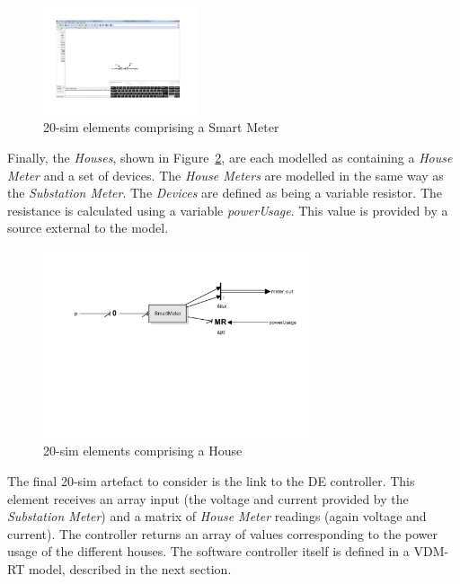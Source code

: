 \begin{description}
\begin{figure}[htb]
\begin{center}
\includegraphics[width=0.4\textwidth]{smartgrid/20-sim-meter.pdf}
\caption{20-sim elements comprising a Smart Meter}
\label{fig:20sim-meter}
\end{center}
\end{figure}

Finally, the \textit{Houses}, shown in Figure~\ref{fig:20sim-house}, are each modelled as containing a \textit{House Meter} and a set of devices. The \textit{House Meters} are modelled in the same way as the \textit{Substation Meter}. The \textit{Devices} are defined as being a variable resistor. The resistance is calculated using a variable \emph{powerUsage}. This value is provided by a source external to the model.

\begin{figure}[htb]
\begin{center}
\includegraphics[width=0.7\textwidth]{smartgrid/20-sim-house.pdf}
\caption{20-sim elements comprising a House}
\label{fig:20sim-house}
\end{center}
\end{figure}

The final 20-sim artefact to consider is the link to the DE controller. This element receives an array input (the voltage and current provided by the \textit{Substation Meter}) and a matrix of \textit{House Meter} readings (again voltage and current). The controller returns an array of values corresponding to the power usage of the different houses. The software controller itself is defined in a VDM-RT model, described in the next section.


\end{description}
